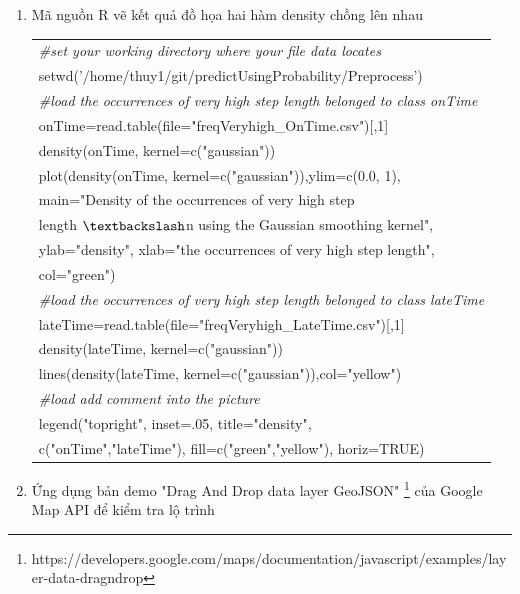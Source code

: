 \documentclass[a4paper, 13pt]{report}
\begin{document}
\begin{enumerate}[label=\textbf{PL\arabic*}]
\item Mã nguồn R vẽ kết quả đồ họa hai hàm density chồng lên nhau
\begin{flushleft}
\begin{tabular}{  |l| }
\hline 
\textit{\#set your working directory where your file data locates}\\
setwd('/home/thuy1/git/predictUsingProbability/Preprocess')\\
\textit{\#load the occurrences of very high step length belonged to class onTime}\\
onTime=read.table(file="freqVeryhigh\_OnTime.csv")[,1]\\
density(onTime, kernel=c("gaussian"))\\
plot(density(onTime, kernel=c("gaussian")),ylim=c(0.0, 1),\\
\hspace{.5cm} main="Density of the occurrences of very high step\\
\hspace{1.7cm} length $\textbackslash$n using the Gaussian smoothing kernel",\\
\hspace{.5cm}     ylab="density", xlab="the occurrences of very high step length",\\
\hspace{.5cm}     col="green")\\
\textit{\#load the occurrences of very high step length belonged to class lateTime}\\
lateTime=read.table(file="freqVeryhigh\_LateTime.csv")[,1]\\
density(lateTime, kernel=c("gaussian"))\\
lines(density(lateTime, kernel=c("gaussian")),col="yellow")\\
\textit{\#load add comment into the picture}\\
legend("topright", inset=.05, title="density",\\
\hspace{.7cm} c("onTime","lateTime"), fill=c("green","yellow"), horiz=TRUE)\\
\hline
\end{tabular}
\end{flushleft}
\item \label{DragAndDrop} Ứng dụng bản demo "Drag And Drop data layer GeoJSON" \footnote{https://developers.google.com/maps/documentation/javascript/examples/layer-data-dragndrop} của Google Map API để kiểm tra lộ trình\\
\FloatBarrier

\end{enumerate}
\end{document}
